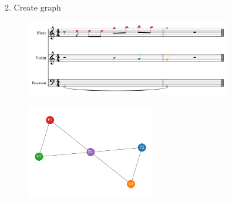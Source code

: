\documentclass[handout]{beamer}
\begin{document}
\begin{frame}{2. Create graph}
    \begin{figure}
        \includegraphics[width=0.8\textwidth]{../Figures/toy-1.png}
    \end{figure}
    \begin{figure}
        \includegraphics[width=0.5\textwidth]{../Figures/toy_graph.pdf}
    \end{figure}
\end{frame}
\end{document}
